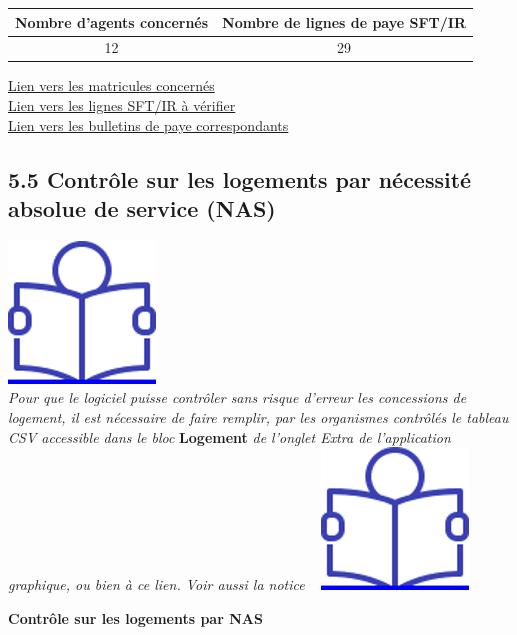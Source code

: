 \begin{longtable}[]{@{}cc@{}}
\toprule
Nombre d'agents concernés & Nombre de lignes de paye
SFT/IR\tabularnewline
\midrule
\endhead
12 & 29\tabularnewline
\bottomrule
\end{longtable}

\href{../Bases/Reglementation/matricules.SFT_IR.et.vacations.csv}{Lien vers
les matricules concernés}\\
\href{../Bases/Reglementation/SFT_IR.et.vacations.csv}{Lien vers les lignes
SFT/IR à vérifier}\\
\href{../Bases/Reglementation/Paie_vac_sft_ir.csv}{Lien vers les bulletins
de paye correspondants}

\hypertarget{controle-sur-les-logements-par-necessite-absolue-de-service-nas}{%
\subsection{5.5 Contrôle sur les logements par nécessité absolue de
service
(NAS)}\label{controle-sur-les-logements-par-necessite-absolue-de-service-nas}}

\href{../Docs/Notices/fiche_NAS.odt}{\includegraphics{icones/Notice.png}}\\
\emph{Pour que le logiciel puisse contrôler sans risque d'erreur les
concessions de logement, il est nécessaire de faire remplir, par les
organismes contrôlés le tableau CSV accessible dans le bloc}
\textbf{Logement} \emph{de l'onglet Extra de l'application graphique, ou
bien à ce lien. Voir aussi la notice} ~
\href{../Docs/Notices/fiche_tableau_logements.odt}{\includegraphics{icones/Notice.png}}

\textbf{Contrôle sur les logements par NAS}

